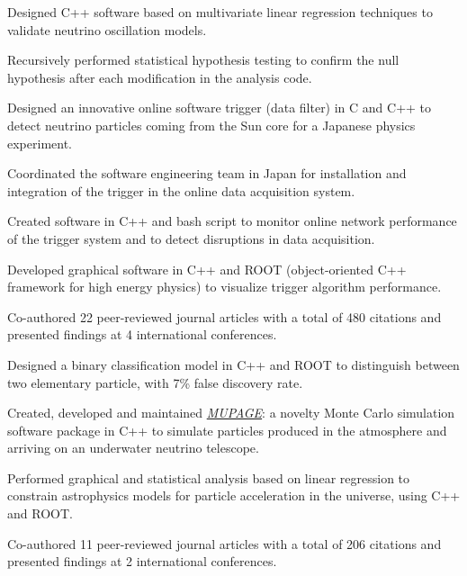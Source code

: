 \documentclass[letterpaper]{deedy-resume} %
\begin{document}
\begin{minipage}[t]{0.66\textwidth}
\begin{tightitemize}
\item Designed C++ software based on multivariate linear regression techniques to validate neutrino oscillation models.
\item Recursively performed statistical hypothesis testing to confirm the null hypothesis after each modification in the analysis code.
\item Designed an innovative online software trigger (data filter) in C and C++ to detect neutrino particles coming from the Sun core for a Japanese physics experiment.
\item Coordinated the software engineering team in Japan for installation and integration of the trigger in the online data acquisition system.
\item Created software in C++ and bash script to monitor online network performance of the trigger system and to detect disruptions in data acquisition.
\item Developed graphical software in C++ and ROOT (object-oriented C++ framework for high energy physics) to visualize trigger algorithm performance. 
\item Co-authored 22 peer-reviewed journal articles with a total of 480 citations and presented findings at 4 international conferences. 
\end{tightitemize}

\sectionspace %



\begin{tightitemize}
\item Designed a binary classification model in C++ and ROOT to distinguish between two elementary particle, with 7\% false discovery rate.
\item Created, developed and maintained \href{https://github.com/giadac/MUPAGE}{\textit{MUPAGE}}: a novelty Monte Carlo simulation software package in C++ to simulate particles produced in the atmosphere and arriving on an underwater neutrino telescope.
\item Performed graphical and statistical analysis based on linear regression to constrain astrophysics models for particle acceleration in the universe, using C++ and ROOT.
\item Co-authored 11 peer-reviewed journal articles with a total of 206 citations and presented findings at 2 international conferences.
\end{tightitemize}


\end{minipage}
\end{document}
